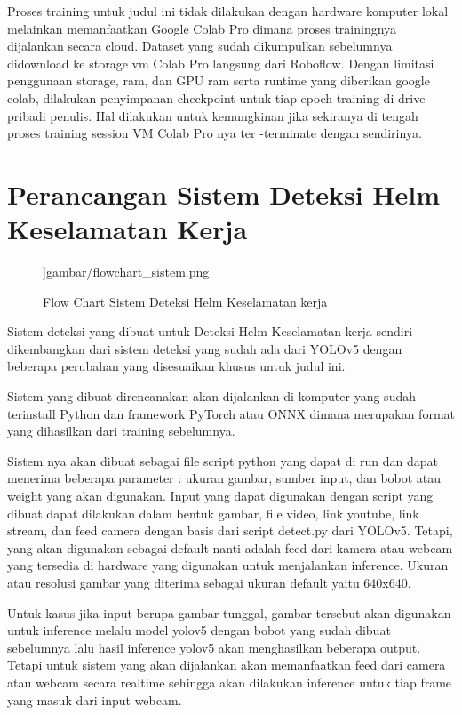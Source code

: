 Proses training untuk judul ini tidak dilakukan dengan hardware komputer lokal melainkan memanfaatkan Google Colab Pro dimana proses trainingnya dijalankan secara cloud. 
Dataset yang sudah dikumpulkan sebelumnya didownload ke storage vm Colab Pro langsung dari Roboflow.  Dengan limitasi penggunaan storage, ram, dan GPU ram serta runtime yang diberikan google colab, dilakukan penyimpanan checkpoint untuk tiap epoch training di drive pribadi penulis. Hal dilakukan untuk kemungkinan jika sekiranya di tengah proses training session VM Colab Pro nya ter -terminate dengan sendirinya. 


\section{Perancangan Sistem Deteksi Helm Keselamatan Kerja}
\label{sec:perancangansistem}

\begin{figure}[h]
  \centering
  ]{gambar/flowchart_sistem.png}
  \caption{Flow Chart Sistem Deteksi Helm Keselamatan kerja}
  \label{fig:flchartsistemdeteksi}  
\end{figure}

Sistem deteksi yang dibuat untuk Deteksi Helm Keselamatan kerja sendiri dikembangkan dari sistem deteksi yang sudah ada dari YOLOv5 dengan beberapa perubahan yang disesuaikan khusus untuk judul ini. 

Sistem yang dibuat direncanakan akan dijalankan di komputer yang sudah terinstall Python dan framework PyTorch atau ONNX dimana merupakan format yang dihasilkan dari training sebelumnya.

Sistem nya akan dibuat sebagai file script python yang dapat di run dan dapat menerima beberapa parameter : ukuran gambar, sumber input, dan bobot atau weight yang akan digunakan. 
Input yang dapat digunakan dengan script yang dibuat dapat dilakukan dalam bentuk gambar, file video, link youtube, link stream, dan feed camera dengan basis dari script detect.py dari YOLOv5. Tetapi, yang akan digunakan sebagai default nanti adalah feed dari kamera atau webcam yang tersedia di hardware yang digunakan untuk menjalankan inference. Ukuran atau resolusi gambar yang diterima sebagai ukuran default yaitu 640x640. 

Untuk kasus jika input berupa gambar tunggal, gambar tersebut akan digunakan untuk inference melalu model yolov5 dengan bobot yang sudah dibuat sebelumnya lalu hasil inference yolov5 akan menghasilkan beberapa output. Tetapi untuk sistem yang akan dijalankan akan memanfaatkan feed dari camera atau webcam secara realtime sehingga akan dilakukan inference untuk tiap frame yang masuk dari input webcam.

